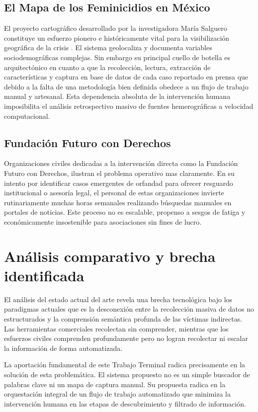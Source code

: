 \subsection{El Mapa de los Feminicidios en México}
El proyecto cartográfico desarrollado por la investigadora María Salguero constituye un esfuerzo
pionero e históricamente vital para la visibilización geográfica de la crisis \cite{salguero2019mapa}.
El sistema geolocaliza y documenta variables sociodemográficas complejas. Sin embargo su principal
cuello de botella es arquitectónico en cuanto a que la recolección, lectura, extracción de características y
captura en base de datos de cada caso reportado en prensa que debido a la falta de una metodología bien definida
obedece a un flujo de trabajo manual y artesanal. Esta dependencia absoluta de la intervención humana
imposibilita el análisis retrospectivo masivo de fuentes hemerográficas a velocidad
computacional.

\subsection{Fundación Futuro con Derechos}
Organizaciones civiles dedicadas a la intervención directa como la Fundación Futuro con
Derechos, ilustran el problema operativo mas claramente. En su intento por identificar casos
emergentes de orfandad para ofrecer resguardo institucional o asesoría legal, el personal de
estas organizaciones invierte rutinariamente muchas horas semanales realizando búsquedas
manuales en portales de noticias. Este proceso no es escalable, propenso a sesgos de fatiga y
económicamente insostenible para asociaciones sin fines de lucro.

\section{Análisis comparativo y brecha identificada}
\label{sec:ea_brecha}

El análisis del estado actual del arte revela una brecha tecnológica bajo los paradigmas actuales
que es la desconexión entre la recolección masiva de datos no estructurados y la
comprensión semántica profunda de las víctimas indirectas. Las herramientas comerciales recolectan sin
comprender, mientras que los esfuerzos civiles comprenden profundamente pero no logran recolectar ni
escalar la información de forma automatizada.

La aportación fundamental de este Trabajo Terminal radica precisamente en la solución de esta problemática.
El sistema propuesto no es un simple buscador de palabras clave ni un mapa de captura manual. Su propuesta
radica en la orquestación integral de un flujo de trabajo automatizado que minimiza la
intervención humana en las etapas de descubrimiento y filtrado de información.

